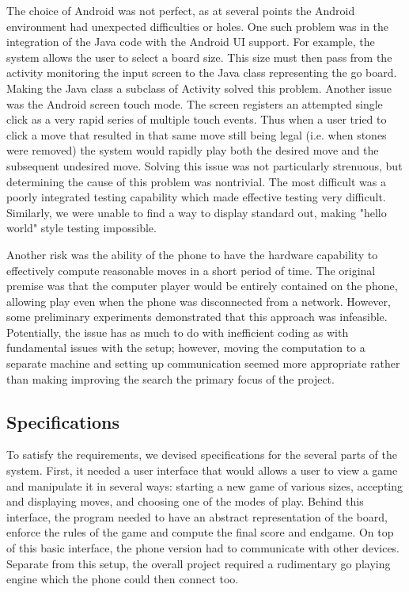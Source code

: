 \documentclass[acmtocl]{acmtrans2m}
\begin{document}
The choice of Android was not perfect, as at several points the Android environment had unexpected difficulties or holes.  One such problem was in the integration of the Java code with the Android UI support.  For example, the system allows the user to select a board size.  This size must then pass from the activity monitoring the input screen to the Java class representing the go board.  Making the Java class a subclass of Activity solved this problem.  Another issue was the Android screen touch mode.  The screen registers an attempted single click as a very rapid series of multiple touch events.  Thus when a user tried to click a move that resulted in that same move still being legal (i.e. when stones were removed) the system would rapidly play both the desired move and the subsequent undesired move.  Solving this issue was not particularly strenuous, but determining the cause of this problem was nontrivial.  The most difficult was a poorly integrated testing capability which made effective testing very difficult.  Similarly, we were unable to find a way to display standard out, making "hello world" style testing impossible. 

Another risk was the ability of the phone to have the hardware capability to effectively compute reasonable moves in a short period of time.  The original premise was that the computer player would be entirely contained on the phone, allowing play even when the phone was disconnected from a network.  However, some preliminary experiments demonstrated that this approach was infeasible.  Potentially, the issue has as much to do with inefficient coding as with fundamental issues with the setup; however, moving the computation to a separate machine and setting up communication seemed more appropriate rather than making improving the search the primary focus of the project.

\subsection{Specifications}

To satisfy the requirements, we devised specifications for the several parts of the system.  First, it needed a user interface that would allows a user to view a game and manipulate it in several ways: starting a new game of various sizes, accepting and displaying moves, and choosing one of the modes of play.  Behind this interface, the program needed to have an abstract representation of the board, enforce the rules of the game and compute the final score and endgame.  On top of this basic interface, the phone version had to communicate with other devices.  Separate from this setup, the overall project required a rudimentary go playing engine which the phone could then connect too.  
\end{document}

